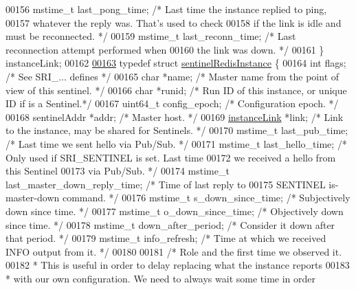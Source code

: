 \begin{DoxyCode}
00156     mstime\_t last\_pong\_time;  \textcolor{comment}{/* Last time the instance replied to ping,}
00157 \textcolor{comment}{                                 whatever the reply was. That's used to check}
00158 \textcolor{comment}{                                 if the link is idle and must be reconnected. */}
00159     mstime\_t last\_reconn\_time;  \textcolor{comment}{/* Last reconnection attempt performed when}
00160 \textcolor{comment}{                                   the link was down. */}
00161 \} instanceLink;
00162 
\hyperlink{structsentinelRedisInstance}{00163} \textcolor{keyword}{typedef} \textcolor{keyword}{struct} \hyperlink{structsentinelRedisInstance}{sentinelRedisInstance} \{
00164     \textcolor{keywordtype}{int} flags;      \textcolor{comment}{/* See SRI\_... defines */}
00165     \textcolor{keywordtype}{char} *name;     \textcolor{comment}{/* Master name from the point of view of this sentinel. */}
00166     \textcolor{keywordtype}{char} *runid;    \textcolor{comment}{/* Run ID of this instance, or unique ID if is a Sentinel.*/}
00167     uint64\_t config\_epoch;  \textcolor{comment}{/* Configuration epoch. */}
00168     sentinelAddr *addr; \textcolor{comment}{/* Master host. */}
00169     \hyperlink{structinstanceLink}{instanceLink} *link; \textcolor{comment}{/* Link to the instance, may be shared for Sentinels. */}
00170     mstime\_t last\_pub\_time;   \textcolor{comment}{/* Last time we sent hello via Pub/Sub. */}
00171     mstime\_t last\_hello\_time; \textcolor{comment}{/* Only used if SRI\_SENTINEL is set. Last time}
00172 \textcolor{comment}{                                 we received a hello from this Sentinel}
00173 \textcolor{comment}{                                 via Pub/Sub. */}
00174     mstime\_t last\_master\_down\_reply\_time; \textcolor{comment}{/* Time of last reply to}
00175 \textcolor{comment}{                                             SENTINEL is-master-down command. */}
00176     mstime\_t s\_down\_since\_time; \textcolor{comment}{/* Subjectively down since time. */}
00177     mstime\_t o\_down\_since\_time; \textcolor{comment}{/* Objectively down since time. */}
00178     mstime\_t down\_after\_period; \textcolor{comment}{/* Consider it down after that period. */}
00179     mstime\_t info\_refresh;  \textcolor{comment}{/* Time at which we received INFO output from it. */}
00180 
00181     \textcolor{comment}{/* Role and the first time we observed it.}
00182 \textcolor{comment}{     * This is useful in order to delay replacing what the instance reports}
00183 \textcolor{comment}{     * with our own configuration. We need to always wait some time in order}

\end{DoxyCode}
